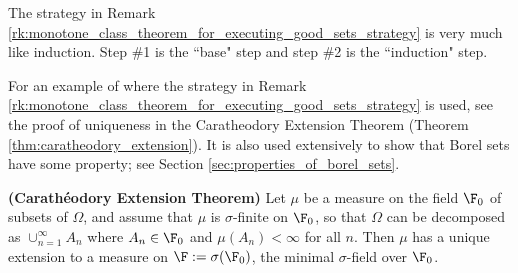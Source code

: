 \documentclass{article} %
\begin{document}
\begin{remark}
The strategy in Remark \ref{rk:monotone_class_theorem_for_executing_good_sets_strategy} is very much like induction.  Step \#1 is the ``base" step and step \#2 is the ``induction" step.
\end{remark}

For an example of where the strategy in Remark \ref{rk:monotone_class_theorem_for_executing_good_sets_strategy} is used, see the proof of uniqueness in the Caratheodory Extension Theorem (Theorem \ref{thm:caratheodory_extension}).  It is also used extensively to show that Borel sets have some property; see Section \ref{sec:properties_of_borel_sets}.


\begin{theorem}{\textbf{(Carath\'eodory Extension Theorem)}} Let $\mu$ be a measure on the field $\F_0$ of subsets of $\Omega$, and assume that $\mu$ is $\sigma$-finite on $\F_0$, so that $\Omega$ can be decomposed as $\cup_{n=1}^\infty A_n$ where $A_n \in \F_0$ and $\mu(A_n) < \infty$ for all $n$.  Then $\mu$ has a unique extension to a measure on $\F := \sigma(\F_0)$, the minimal $\sigma$-field over $\F_0$. 
 \label{thm:caratheodory_extension}
\end{theorem}
\end{document}
